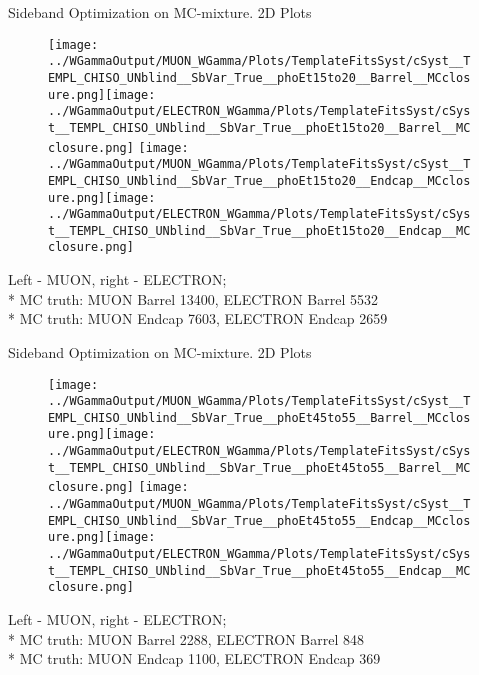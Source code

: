 \documentclass{beamer}
\begin{document}
\begin{frame}{Sideband Optimization on MC-mixture. 2D Plots}
  \begin{figure}
    \centering
    \texttt{[image: ../WGammaOutput/MUON\_WGamma/Plots/TemplateFitsSyst/cSyst\_\_TEMPL\_CHISO\_UNblind\_\_SbVar\_True\_\_phoEt15to20\_\_Barrel\_\_MCclosure.png]}\texttt{[image: ../WGammaOutput/ELECTRON\_WGamma/Plots/TemplateFitsSyst/cSyst\_\_TEMPL\_CHISO\_UNblind\_\_SbVar\_True\_\_phoEt15to20\_\_Barrel\_\_MCclosure.png]}
    \texttt{[image: ../WGammaOutput/MUON\_WGamma/Plots/TemplateFitsSyst/cSyst\_\_TEMPL\_CHISO\_UNblind\_\_SbVar\_True\_\_phoEt15to20\_\_Endcap\_\_MCclosure.png]}\texttt{[image: ../WGammaOutput/ELECTRON\_WGamma/Plots/TemplateFitsSyst/cSyst\_\_TEMPL\_CHISO\_UNblind\_\_SbVar\_True\_\_phoEt15to20\_\_Endcap\_\_MCclosure.png]}
    \end{figure}
  \scriptsize Left - MUON, right - ELECTRON; \\*
  \scriptsize MC truth: MUON Barrel 13400, ELECTRON Barrel 5532 \\*
  \scriptsize MC truth: MUON Endcap  7603, ELECTRON Endcap 2659 
\end{frame}

\begin{frame}{Sideband Optimization on MC-mixture. 2D Plots}
  \begin{figure}
    \centering
    \texttt{[image: ../WGammaOutput/MUON\_WGamma/Plots/TemplateFitsSyst/cSyst\_\_TEMPL\_CHISO\_UNblind\_\_SbVar\_True\_\_phoEt45to55\_\_Barrel\_\_MCclosure.png]}\texttt{[image: ../WGammaOutput/ELECTRON\_WGamma/Plots/TemplateFitsSyst/cSyst\_\_TEMPL\_CHISO\_UNblind\_\_SbVar\_True\_\_phoEt45to55\_\_Barrel\_\_MCclosure.png]}
    \texttt{[image: ../WGammaOutput/MUON\_WGamma/Plots/TemplateFitsSyst/cSyst\_\_TEMPL\_CHISO\_UNblind\_\_SbVar\_True\_\_phoEt45to55\_\_Endcap\_\_MCclosure.png]}\texttt{[image: ../WGammaOutput/ELECTRON\_WGamma/Plots/TemplateFitsSyst/cSyst\_\_TEMPL\_CHISO\_UNblind\_\_SbVar\_True\_\_phoEt45to55\_\_Endcap\_\_MCclosure.png]}
    \end{figure}
  \scriptsize Left - MUON, right - ELECTRON; \\*
  \scriptsize MC truth: MUON Barrel 2288, ELECTRON Barrel 848 \\*
  \scriptsize MC truth: MUON Endcap 1100, ELECTRON Endcap 369 
\end{frame}
\end{document}
